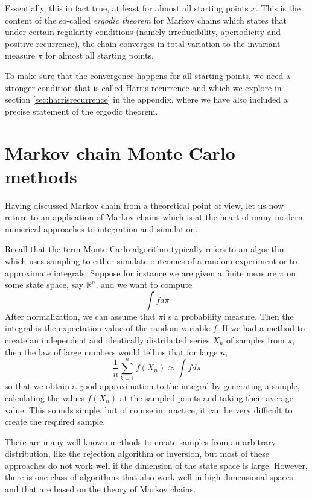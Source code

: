 \documentclass[a4paper, draft]{article}
\theoremstyle{own}
\theoremstyle{remark}
\newcommand{\R}{\mathbb{R}}
\begin{document}
Essentially, this in fact true, at least for almost all starting points $x$. This is the content of the so-called {\em ergodic theorem} for Markov chains which states that under certain regularity conditions (namely irreducibility, aperiodicity and positive recurrence), the chain converges in total variation to the invariant measure $\pi$ for almost all starting points.

To make sure that the convergence happens for all starting points, we need a stronger condition that is called Harris recurrence and which we explore in section \ref{sec:harrisrecurrence} in the appendix, where we have also included a precise statement of the ergodic theorem.




\section{Markov chain Monte Carlo methods}


Having discussed Markov chain from a theoretical point of view, let us now return to an application of Markov chains which is at the heart of many modern numerical approaches to integration and simulation. 

Recall that the term Monte Carlo algorithm typically refers to an algorithm which uses sampling to either simulate outcomes of a random experiment or to approximate integrals. Suppose for instance we are given a finite measure $\pi$ on some state space, say $\R^n$, and we want to compute 
$$
 \int f d\pi
$$
After normalization, we can assume that $\pi$i s a probability measure. Then the integral is the expectation value of the random variable $f$. If we had a method to create an independent and identically distributed series $X_n$ of samples from $\pi$, then the law of large numbers would tell us that for large $n$,
$$
\frac{1}{n} \sum_{k=1}^n f(X_n) \approx \int f d\pi
$$
so that we obtain a good approximation to the integral by generating a sample, calculating the values $f(X_n)$ at the sampled points and taking their average value. This sounds simple, but of course in practice, it can be very difficult to create the required sample.

There are many well known methods to create samples from an arbitrary distribution, like the rejection algorithm or inversion, but most of these approaches do not work well if the dimension of the state space is large. However, there is one class of algorithms that also work well in high-dimensional spaces and that are based on the theory of Markov chains.
\end{document}
